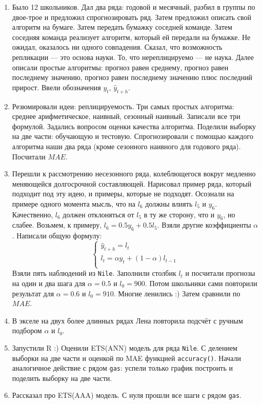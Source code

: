 \documentclass[12pt]{article}
\theoremstyle{definition}
\begin{document}
\begin{enumerate}
  \item Было 12 школьников. Дал два ряда: годовой и месячный, разбил в группы по двое-трое и предложил спрогнозировать ряд. 
  Затем предложил описать свой алгоритм на бумаге. Затем передать бумажку соседней команде. Затем соседняя команда реализует 
  алгоритм, который ей передали на бумажке. Не ожидал, оказалось ни одного совпадения. Сказал, что возможность репликации — это основа науки.
  То, что нереплицируемо — не наука. Далее описали простые алгоритмы: прогноз равен среднему, прогноз равен последнему значению,
  прогноз равен последнему значению плюс последний прирост. Ввели обозначения $y_t$, $\hat y_{t+h}$.
  \item Резюмировали идеи: реплицируемость. Три самых простых алгоритма: среднее арифметическое, наивный, сезонный наивный. 
  Записали все три формулой. Задались вопросом оценки качества алгоритма. Поделили выборку на две части: обучающую и тестовую. 
  Спрогнозировали с помощью каждого алгоритма наши два ряда (кроме сезонного наивного для годового ряда). Посчитали $MAE$.
  \item Перешли к рассмотрению несезонного ряда, колеблющегося вокруг медленно меняющейся долгосрочной составляющей. 
  Нарисовал пример ряда, который подходит под эту идею, и примеры, которые не подходят. 
  Осознали на примере одного момента мысль, что на $l_6$ должны влиять $l_5$ и $y_6$. 
  Качественно, $l_6$ должен отклоняться от $l_5$ в ту же сторону, что и $y_6$, но слабее. 
  Возьмем, к примеру, $l_6 = 0.5 y_6 + 0.5 l_5$. Взяли другие коэффициенты $\alpha$. 
  Написали общую формулу: 
  \[
    \begin{cases}
    \hat y_{t+h} = l_t \\
    l_t = \alpha y_t + (1-\alpha) l_{t-1} \\
    \end{cases}
  \]
  Взяли пять наблюдений из \verb|Nile|. Заполнили столбик $l_t$ и посчитали прогнозы на один и два шага для $\alpha = 0.5$ и $l_0 = 900$. Потом школьники сами 
  повторили результат для $\alpha = 0.6$ и $l_0 = 910$. Многие ленились :) Затем сравнили по $MAE$.
  \item В экселе на двух более длинных рядах Лена повторила подсчёт с ручным подбором $\alpha$ и $l_0$. 
  \item Запустили R :) Оценили ETS(ANN) модель для ряда \verb|Nile|. С делением выборки на две части и оценкой по MAE функцией \verb|accuracy()|.
  Начали аналогичное действие с рядом \verb|gas|: успели только график построить и поделить выборку на две части.  
  \item Рассказал про ETS(AAA) модель. С нуля прошли все шаги с рядом \verb|gas|.
\end{enumerate}
\end{document}
